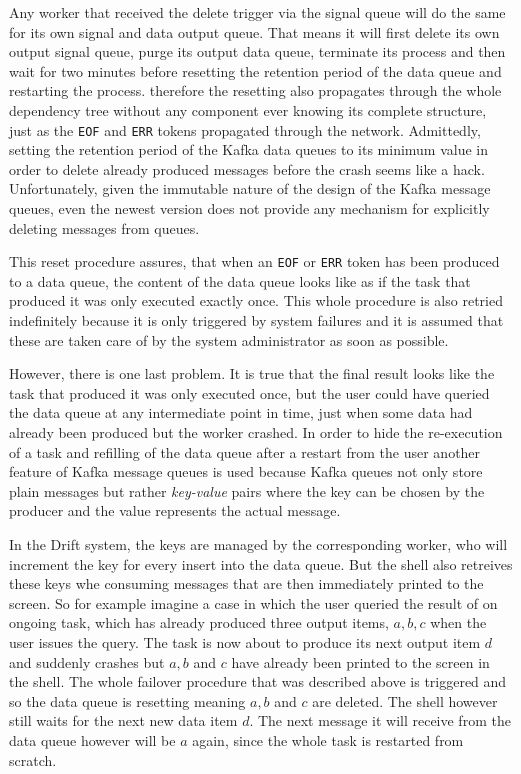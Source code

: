Any worker that received the delete trigger via the signal queue
will do the same for its own signal and data output queue. That
means it will first delete its own output signal queue, purge
its output data queue, terminate its process and then wait for
two minutes before resetting the retention period of the data queue
and restarting the process.
therefore the resetting also propagates through the whole dependency
tree without any component ever knowing its complete structure,
just as the \texttt{EOF} and \texttt{ERR} tokens propagated through
the network.
Admittedly, setting the retention period of the Kafka data queues
to its minimum value in order to delete already produced messages
before the crash seems like a hack. Unfortunately, given the
immutable nature of the design of the Kafka message queues, even
the newest version does not provide any mechanism for explicitly
deleting messages from queues.

This reset procedure assures, that when an \texttt{EOF} or
\texttt{ERR} token has been produced to a data queue, the content
of the data queue looks like as if the task that produced it
was only executed exactly once. This whole procedure is also
retried indefinitely because it is only triggered by system
failures and it is assumed that these are taken care of by
the system administrator as soon as possible.
\newline

However, there is one last problem. It is true that the final
result looks like the task that produced it was only executed once,
but the user could have queried the data queue at any intermediate
point in time, just when some data had already been produced
but the worker crashed. In order to hide the re-execution of a
task and refilling of the data queue after a restart from the user
another feature of Kafka message queues is used because
Kafka queues not only store plain messages but rather
\textit{key-value} pairs where the key can be chosen
by the producer and the value represents the actual message.

In the Drift system, the keys are managed by the corresponding
worker, who will increment the key for every insert into the
data queue. But the shell also retreives these keys whe
consuming messages that are then immediately printed to the
screen. So for example imagine a case in which the user queried
the result of on ongoing task, which has already produced three
output items, $a, b, c$ when the user issues the query.
The task is now about to produce its next output item $d$ and
suddenly crashes but $a, b$ and $c$ have already been printed
to the screen in the shell. The whole failover procedure that
was described above is triggered and so the data queue is resetting
meaning $a, b$ and $c$ are deleted. The shell however still waits
for the next new data item $d$. The next message it will receive
from the data queue however will be $a$ again, since the whole
task is restarted from scratch.


